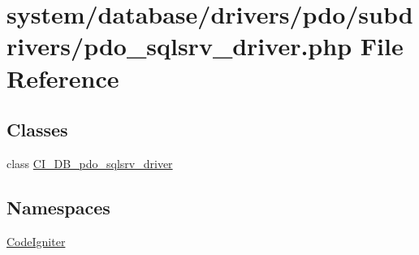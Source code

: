\hypertarget{pdo__sqlsrv__driver_8php}{}\section{system/database/drivers/pdo/subdrivers/pdo\+\_\+sqlsrv\+\_\+driver.php File Reference}
\label{pdo__sqlsrv__driver_8php}
\subsection*{Classes}
\begin{DoxyCompactItemize}
\item 
class \mbox{\hyperlink{class_c_i___d_b__pdo__sqlsrv__driver}{C\+I\+\_\+\+D\+B\+\_\+pdo\+\_\+sqlsrv\+\_\+driver}}
\end{DoxyCompactItemize}
\subsection*{Namespaces}
\begin{DoxyCompactItemize}
\item 
 \mbox{\hyperlink{namespace_code_igniter}{Code\+Igniter}}
\end{DoxyCompactItemize}
